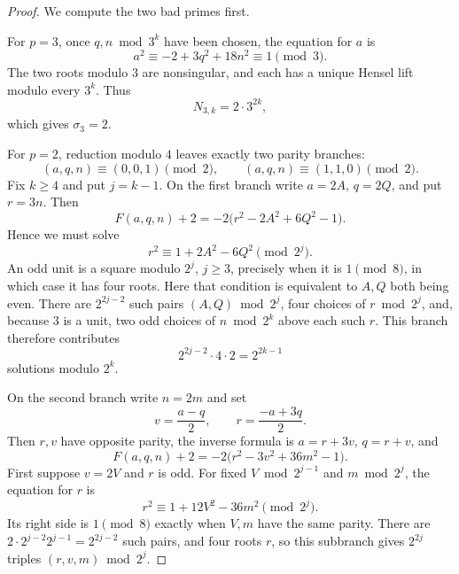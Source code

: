 \begin{proof}
We compute the two bad primes first.

For \(p=3\), once \(q,n\bmod3^k\) have been chosen, the equation for
\(a\) is
\[
 a^2\equiv-2+3q^2+18n^2\equiv1\pmod3.
\]
The two roots modulo \(3\) are nonsingular, and each has a unique Hensel
lift modulo every \(3^k\).  Thus
\begin{equation}
 N_{3,k}=2\cdot3^{2k},
 \label{koide-count-eq-three-adic-count}
\end{equation}
which gives \(\sigma_3=2\).

For \(p=2\), reduction modulo \(4\) leaves exactly two parity branches:
\begin{equation}
 (a,q,n)\equiv(0,0,1)\pmod2,
 \qquad
 (a,q,n)\equiv(1,1,0)\pmod2.
 \label{koide-count-eq-two-adic-branches}
\end{equation}
Fix \(k\geq4\) and put \(j=k-1\).  On the first branch write
\(a=2A\), \(q=2Q\), and put \(r=3n\).  Then
\begin{equation}
 F(a,q,n)+2
 =-2\bigl(r^2-2A^2+6Q^2-1\bigr).
 \label{koide-count-eq-two-adic-even-branch}
\end{equation}
Hence we must solve
\[
 r^2\equiv1+2A^2-6Q^2\pmod{2^j}.
\]
An odd unit is a square modulo \(2^j\), \(j\geq3\), precisely when it is
\(1\pmod8\), in which case it has four roots.  Here that condition is
equivalent to \(A,Q\) both being even.  There are \(2^{2j-2}\) such pairs
\((A,Q)\bmod2^j\), four choices of \(r\bmod2^j\), and, because \(3\) is
a unit, two odd choices of \(n\bmod2^k\) above each such \(r\).  This
branch therefore contributes
\begin{equation}
 2^{2j-2}\cdot4\cdot2=2^{2k-1}
 \label{koide-count-eq-two-adic-first-branch-count}
\end{equation}
solutions modulo \(2^k\).

On the second branch write \(n=2m\) and set
\begin{equation}
 v=\frac{a-q}{2},
 \qquad
 r=\frac{-a+3q}{2}.
 \label{koide-count-eq-two-adic-divided-coordinates}
\end{equation}
Then \(r,v\) have opposite parity, the inverse formula is
\(a=r+3v\), \(q=r+v\), and
\begin{equation}
 F(a,q,n)+2
 =-2\bigl(r^2-3v^2+36m^2-1\bigr).
 \label{koide-count-eq-two-adic-odd-branch}
\end{equation}
First suppose \(v=2V\) and \(r\) is odd.  For fixed
\(V\bmod2^{j-1}\) and \(m\bmod2^j\), the equation for \(r\) is
\[
 r^2\equiv1+12V^2-36m^2\pmod{2^j}.
\]
Its right side is \(1\pmod8\) exactly when \(V,m\) have the same parity.
There are
\(2\cdot2^{j-2}2^{j-1}=2^{2j-2}\) such pairs, and four roots \(r\),
so this subbranch gives \(2^{2j}\) triples \((r,v,m)\bmod2^j\).


\end{proof}
